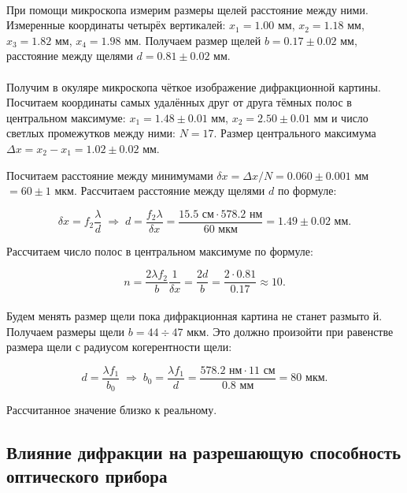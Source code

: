 \documentclass[a4paper,12pt]{article} %
\begin{document}
\paragraph{} При помощи микроскопа измерим размеры щелей расстояние между ними. Измеренные координаты четырёх вертикалей: $x_1 = 1.00$ мм, $x_2 = 1.18$ мм, $x_3 = 1.82$ мм, $x_4 = 1.98$ мм. Получаем размер щелей $b = 0.17 \pm 0.02$ мм, расстояние между щелями $d = 0.81 \pm 0.02$ мм.

\paragraph{} Получим в окуляре микроскопа чёткое изображение дифракционной картины. Посчитаем координаты самых удалённых друг от друга тёмных полос в центральном максимуме: $x_1 = 1.48 \pm 0.01$ мм, $x_2 = 2.50 \pm 0.01$ мм и число светлых промежутков между ними: $N = 17$. Размер центрального максимума $\Delta x = x_2 - x_1 = 1.02 \pm 0.02$ мм. 

Посчитаем расстояние между минимумами $\delta x = \Delta x / N = 0.060 \pm 0.001$ мм $ = 60 \pm 1$ мкм. Рассчитаем расстояние между щелями $d$ по формуле:

\[
\delta x = f_2 \frac{\lambda}{d} \; \Rightarrow \; d = \frac{f_2 \lambda}{\delta x} = \frac{15.5 \text{ см} \cdot 578.2 \text{ нм}}{60 \text{ мкм}} = 1.49 \pm 0.02 \text{ мм}.
\]

Рассчитаем число полос в центральном максимуме по формуле:

\[
n = \frac{2 \lambda f_2}{b} \frac{1}{\delta x} = \frac{2d}{b} = \frac{2 \cdot 0.81}{0.17} \approx 10.
\]

\paragraph{} Будем менять размер щели пока дифракционная картина не станет размыто	й. Получаем размеры щели $b = 44 \div 47$ мкм. Это должно произойти при равенстве размера щели с радиусом когерентности щели:

\[
d = \frac{\lambda f_1}{b_0} \; \Rightarrow \; b_0 = \frac{\lambda f_1}{d} =  \frac{578.2 \text{ нм} \cdot 11 \text{ см}}{0.8 \text{ мм}} = 80 \text{ мкм}.
\]

\noindent Рассчитанное значение близко к реальному.

\subsection{Влияние дифракции на разрешающую способность оптического прибора}
\end{document}
